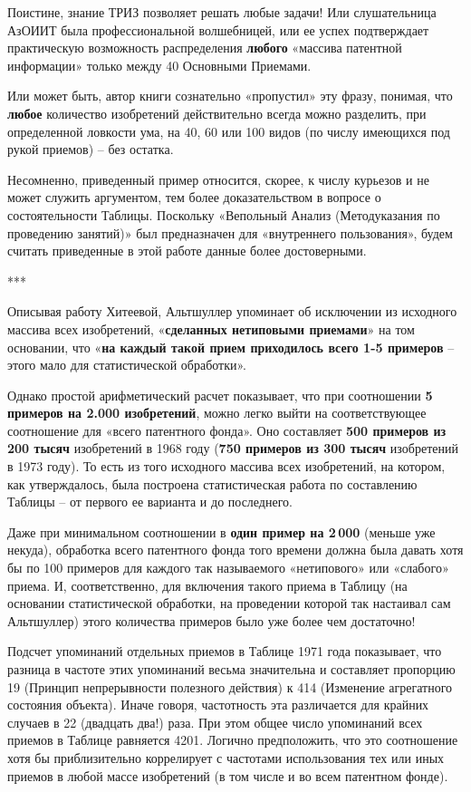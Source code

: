 \documentclass[11pt,a4paper]{article}
\begin{document}
Поистине, знание ТРИЗ позволяет решать любые задачи! Или слушательница АзОИИТ
была профессиональной волшебницей, или ее успех подтверждает практическую
возможность распределения \textbf{любого} «массива патентной информации»
только между 40 Основными Приемами.

Или может быть, автор книги сознательно «пропустил» эту фразу, понимая, что
\textbf{любое} количество изобретений действительно всегда можно разделить,
при определенной ловкости ума, на 40, 60 или 100 видов (по числу имеющихся под
рукой приемов) -- без остатка.

Несомненно, приведенный пример относится, скорее, к числу курьезов и не может
служить аргументом, тем более доказательством в вопросе о состоятельности
Таблицы. Поскольку «Вепольный Анализ (Методуказания по проведению занятий)»
\cite{Altshuller1973b} был предназначен для «внутреннего пользования», будем
считать приведенные в этой работе данные более достоверными.

\begin{center}  *** \end{center}

Описывая работу Хитеевой, Альтшуллер упоминает об исключении из исходного
массива всех изобретений, «\textbf{сделанных нетиповыми приемами}» на том
основании, что «\textbf{на каждый такой прием приходилось всего 1-5 примеров}
-- этого мало для статистической обработки».

Однако простой арифметический расчет показывает, что при соотношении \textbf{5
  примеров на 2.000 изобретений}, можно легко выйти на соответствующее
соотношение для «всего патентного фонда». Оно составляет \textbf{500 примеров
  из 200 тысяч} изобретений в 1968 году (\textbf{750 примеров из 300 тысяч}
изобретений в 1973 году). То есть из того исходного массива всех изобретений,
на котором, как утверждалось, была построена статистическая работа по
составлению Таблицы -- от первого ее варианта и до последнего.

Даже при минимальном соотношении в \textbf{один пример на 2\,000} (меньше уже
некуда), обработка всего патентного фонда того времени должна была давать хотя
бы по 100 примеров для каждого так называемого «нетипового» или «слабого»
приема. И, соответственно, для включения такого приема в Таблицу (на основании
статистической обработки, на проведении которой так настаивал сам Альтшуллер)
этого количества примеров было уже более чем достаточно!

Подсчет упоминаний отдельных приемов в Таблице 1971 года показывает, что
разница в частоте этих упоминаний весьма значительна и составляет пропорцию 19
(Принцип непрерывности полезного действия) к 414 (Изменение агрегатного
состояния объекта). Иначе говоря, частотность эта различается для крайних
случаев в 22 (двадцать два!) раза. При этом общее число упоминаний всех
приемов в Таблице равняется 4201. Логично предположить, что это соотношение
хотя бы приблизительно коррелирует с частотами использования тех или иных
приемов в любой массе изобретений (в том числе и во всем патентном фонде).
\end{document}
